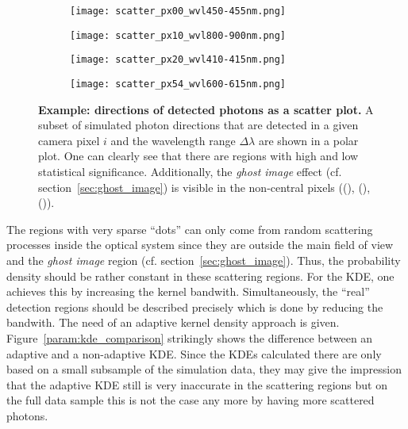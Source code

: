 \begin{figure}[h]
	\centering
	\begin{subfigure}[t]{0.49\textwidth}
		\texttt{[image: scatter\_px00\_wvl450-455nm.png]}
		\subcaption{}
		\label{param:example_scatter:1}
	\end{subfigure}
	\hfill
	\begin{subfigure}[t]{0.49\textwidth}
		\texttt{[image: scatter\_px10\_wvl800-900nm.png]}
		\subcaption{}
		\label{param:example_scatter:2}
	\end{subfigure}
	\vfill
	\begin{subfigure}[b]{0.49\textwidth}
		\texttt{[image: scatter\_px20\_wvl410-415nm.png]}
		\subcaption{}
		\label{param:example_scatter:3}
	\end{subfigure}
	\hfill
	\begin{subfigure}[b]{0.49\textwidth}
		\texttt{[image: scatter\_px54\_wvl600-615nm.png]}
		\subcaption{}
		\label{param:example_scatter:4}
	\end{subfigure}
	\caption[Example: directions of detected photons as a scatter plot]{\textbf{Example: directions of detected photons as a scatter plot.} A subset of simulated photon directions that are detected in a given camera pixel $i$ and the wavelength range $\Delta\lambda$ are shown in a polar plot. One can clearly see that there are regions with high and low statistical significance. Additionally, the \textit{ghost image} effect (cf. section~\ref{sec:ghost_image}) is visible in the non-central pixels ((), (), ()).}
	\label{param:example_scatter}	
\end{figure}

The regions with very sparse \enquote{dots} can only come from random scattering processes inside the optical system since they are outside the main field of view and the \textit{ghost image} region (cf. section~\ref{sec:ghost_image}). Thus, the probability density should be rather constant in these scattering regions. For the KDE, one achieves this by increasing the kernel bandwith. Simultaneously, the \enquote{real} detection regions should be described precisely which is done by reducing the bandwith. The need of an adaptive kernel density approach is given. Figure~\ref{param:kde_comparison} strikingly shows the difference between an adaptive and a non-adaptive KDE. Since the KDEs calculated there are only based on a small subsample of the simulation data, they may give the impression that the adaptive KDE still is very inaccurate in the scattering regions but on the full data sample this is not the case any more by having more scattered photons.

